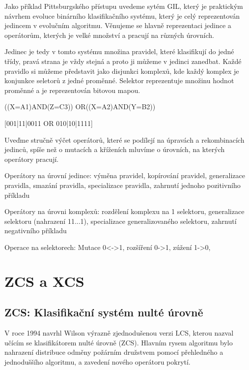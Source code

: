 Jako příklad Pittsburgského přístupu uvedeme sytém GIL, který je praktickým návrhem evoluce binárního klasifikačního systému, který je celý reprezentován jedincem v evolučním algoritmu. Věnujeme se hlavně reprezentaci jedince a operátorům, kterých je velké množství a pracují na různých úrovních.

Jedinec je tedy v tomto systému množina pravidel, které klasifikují do jedné třídy, pravá strana je vždy stejná a proto ji můžeme v jedinci zanedbat. Každé pravidlo si můžeme představit jako disjunkci komplexů, kde každý komplex je konjunkce seletorů z jedné proměnné. Selektor reprezentuje množinu hodnot proměnné a je reprezentován bitovou mapou. 

((X=A1)AND(Z=C3)) OR((X=A2)AND(Y=B2))

[001|11|0011 OR 010|10|1111]

Uveďme stručně výčet operátorů, které se podílejí na úpravách a rekombinacích jedinců, spíše než o mutacích a kříženích mluvíme o úrovních, na kterých operátory pracují.

\begin{description}

\item{Operátory na úrovní jedince:}
výměna pravidel, kopírování pravidel, generalizace pravidla, smazání pravidla, specializace pravidla, zahrnutí jednoho pozitivního příkladu

\item{Operátory na úrovni komplexů:} 
rozdělení komplexu na 1 selektoru, generalizace selektoru (nahrazení 11...1), specializace generalizovaného selektoru, zahrnutí negativního příkladu

\item{Operace na selektorech:}
Mutace 0<->1, rozšíření 0->1, zúžení 1->0, 

\end{description}


\section{ZCS a XCS}

\subsection{ZCS: Klasifikační systém nulté úrovně}

V roce 1994 navrhl Wilson výrazně zjednodušenou verzi LCS, kterou nazval učícím se klasifikátorem nulté úrovně (ZCS). Hlavním rysem algoritmu bylo nahrazení distribuce odměny požárním družstvem pomocí přehledného a jednoduššího algoritmu, a zavedení nového operátoru pokrytí. 

